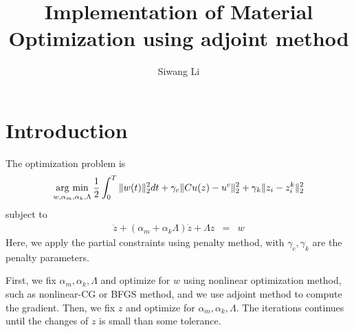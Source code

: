\documentclass[9pt,twocolumn]{extarticle}
\author{Siwang Li}
\title{Implementation of Material Optimization using adjoint method}
\newcommand{\argmin}{\operatornamewithlimits{arg\ min}}
\begin{document}
\maketitle

\setlength{\parskip}{0.5ex}

\section{Introduction}
The optimization problem is
\begin{equation} \label{obj}
  \argmin_{w,\alpha_m,\alpha_k,\Lambda} \frac{1}{2}\int_{0}^T \| w(t) \|_2^2dt +
  \gamma_c \| Cu(z) - u^c \|_2^2 + \gamma_k\| z_i - z_i^k \|_2^2
\end{equation}
subject to
\begin{eqnarray}
  \ddot{z} + (\alpha_m+\alpha_k \Lambda)\dot{z} + \Lambda z &=& w \label{eq_con}
\end{eqnarray}
Here, we apply the partial constraints using penalty method, with
$\gamma_c,\gamma_k$ are the penalty parameters.

First, we fix $\alpha_m,\alpha_k,\Lambda$ and optimize for $w$ using nonlinear
optimization method, such as nonlinear-CG or BFGS method, and we use adjoint
method to compute the gradient. Then, we fix $z$ and optimize for
$\alpha_m,\alpha_k,\Lambda$. The iterations continues until the changes of $z$
is small than some tolerance.
\end{document}
